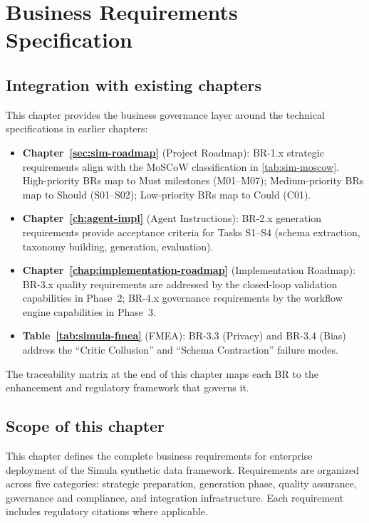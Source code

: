 \chapter{Business Requirements Specification}
\label{chap:business-requirements}

\section*{Integration with existing chapters}

This chapter provides the business governance layer around the technical
specifications in earlier chapters:

\begin{itemize}
  \item \textbf{Chapter~\ref{sec:sim-roadmap}} (Project Roadmap): BR-1.x strategic 
    requirements align with the MoSCoW classification in \cref{tab:sim-moscow}. 
    High-priority BRs map to Must milestones (M01--M07); Medium-priority BRs map 
    to Should (S01--S02); Low-priority BRs map to Could (C01).
  \item \textbf{Chapter~\ref{ch:agent-impl}} (Agent Instructions): BR-2.x generation 
    requirements provide acceptance criteria for Tasks S1--S4 (schema extraction, 
    taxonomy building, generation, evaluation).
  \item \textbf{Chapter~\ref{chap:implementation-roadmap}} (Implementation Roadmap):
    BR-3.x quality requirements are addressed by the closed-loop validation
    capabilities in Phase~2; BR-4.x governance requirements by the workflow
    engine capabilities in Phase~3.
  \item \textbf{Table~\ref{tab:simula-fmea}} (FMEA): BR-3.3 (Privacy) and BR-3.4 
    (Bias) address the ``Critic Collusion'' and ``Schema Contraction'' failure modes.
\end{itemize}

\noindent
The traceability matrix at the end of this chapter maps each BR to the enhancement 
and regulatory framework that governs it.

\section*{Scope of this chapter}

This chapter defines the complete business requirements for enterprise deployment
of the Simula synthetic data framework. Requirements are organized across five
categories: strategic preparation, generation phase, quality assurance, governance
and compliance, and integration infrastructure. Each requirement includes regulatory
citations where applicable.

